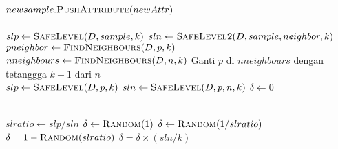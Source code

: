 \begin{center}
\begin{algorithmic}[1]
		\State $ newsample.\Call{PushAttribute}{newAttr} $
	\EndFor
	\\
	\State {}
\EndFunction
\\
	\State $ slp \gets \Call{SafeLevel}{D, sample, k} $
	\State $ sln \gets \Call{SafeLevel2}{D, sample, neighbor, k} $
	\State {}
\EndFunction
\\
	\State $ pneighbor \gets \Call{FindNeighbours}{ D, p, k } $
	\State {}
\EndFunction
\\
	\State $ nneighbours \gets \Call{FindNeighbours}{ D, n, k } $
		\State Ganti $ p $ di $ nneighbours $ dengan tetanggga $ k + 1 $
		dari $ n $
	\EndIf
	\State {}
\EndFunction
\\
	\State $ slp \gets \Call{SafeLevel}{D, p, k} $
	\State $ sln \gets \Call{SafeLevel}{D, p, n, k} $
	\State $ \delta \gets 0 $

		\State \Return{$ \delta $}
	\EndIf
	\\
	\State $ slratio \gets slp / sln $
		\State $ \delta \gets \Call{Random}{1} $
		\State $ \delta \gets \Call{Random}{1 / slratio} $
	\Else
		\State $ \delta = 1 - \Call{Random}{slratio} $
	\EndIf
\pagebreak
		\State $ \delta = \delta \times (sln / k) $
	\EndIf
	\\
	\State \Return{$ \delta $}
\EndFunction
	\end{algorithmic}
\end{center}
